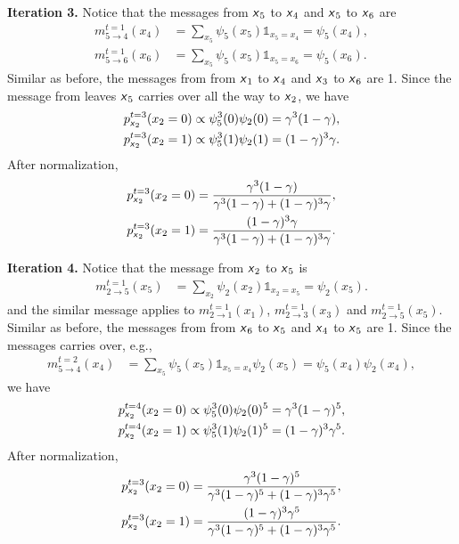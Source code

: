 \documentclass{article}
\newcommand{\s}[1]{\textsf{\textit{#1}}}
\begin{document}
\noindent
\textbf{Iteration 3.} Notice that the messages from $\s{x}_5$ to $\s{x}_4$ and
$\s{x}_5$ to $\s{x}_6$ are
%
\begin{align*}
	m^{t=1}_{5\to4}(x_4) &= \sum_{x_5}\psi_5(x_5)\mathds{1}_{x_5 = x_4} = \psi_5(x_4),\\
	m^{t=1}_{5\to6}(x_6) &= \sum_{x_5}\psi_5(x_5)\mathds{1}_{x_5 = x_6} = \psi_5(x_6).
\end{align*}
%
Similar as before, the messages from from $\s{x}_1$ to $\s{x}_4$ and $\s{x}_3$ to $\s{x}_6$ are 1.
%
Since the message from leaves $\s{x}_5$ carries over all the way to $\s{x}_2$, we have
%
\begin{align}
	p^{t=3}_{\s{x}_2}(x_2=0) \propto \psi_5^3(0)\psi_2(0) = \gamma^3(1 - \gamma),\\
	p^{t=3}_{\s{x}_2}(x_2=1) \propto \psi_5^3(1)\psi_2(1) = (1 - \gamma)^3\gamma.
\end{align}
%
After normalization,
\begin{align}
	p^{t=3}_{\s{x}_2}(x_2=0) = 
		\frac{\gamma^3(1 - \gamma)}{\gamma^3(1 - \gamma) + (1 - \gamma)^3\gamma},\\
	p^{t=3}_{\s{x}_2}(x_2=1) =
		\frac{(1 - \gamma)^3\gamma}{{\gamma^3(1 - \gamma) + (1 - \gamma)^3\gamma}}.
\end{align}

\noindent
\textbf{Iteration 4.} Notice that the message from $\s{x}_2$ to $\s{x}_5$ is
\begin{align*}
	m^{t=1}_{2\to5}(x_5) &= \sum_{x_2}\psi_2(x_2)\mathds{1}_{x_2 = x_5} = \psi_2(x_5).
\end{align*}
%
and the similar message applies to $m^{t=1}_{2\to1}(x_1)$,
$m^{t=1}_{2\to3}(x_3)$ and $m^{t=1}_{2\to5}(x_5)$.
%
Similar as before, the messages from from $\s{x}_6$ to $\s{x}_5$
and $\s{x}_4$ to $\s{x}_5$ are 1.
%
Since the messages carries over, e.g.,
\begin{align*}
	m^{t=2}_{5\to4}(x_4) &= \sum_{x_5}\psi_5(x_5)\mathds{1}_{x_5 = x_4}\psi_2(x_5)
	= \psi_5(x_4)\psi_2(x_4),
\end{align*}
%
we have
\begin{align}
	p^{t=4}_{\s{x}_2}(x_2=0) \propto \psi_5^3(0)\psi_2(0)^5 = \gamma^3(1 - \gamma)^5,\\
	p^{t=4}_{\s{x}_2}(x_2=1) \propto \psi_5^3(1)\psi_2(1)^5 = (1 - \gamma)^3\gamma^5.
\end{align}
%
After normalization,
\begin{align}
	p^{t=3}_{\s{x}_2}(x_2=0) = 
		\frac{\gamma^3(1 - \gamma)^5}{\gamma^3(1 - \gamma)^5 + (1 - \gamma)^3\gamma^5},\\
	p^{t=3}_{\s{x}_2}(x_2=1) =
		\frac{(1 - \gamma)^3\gamma^5}{{\gamma^3(1 - \gamma)^5 + (1 - \gamma)^3\gamma^5}}.
\end{align}
\\
\end{document}
